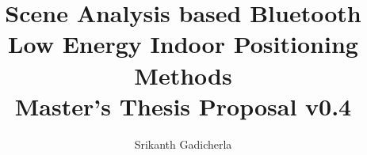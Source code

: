 \documentclass[a4paper,draft]{article}
\title{Scene Analysis based Bluetooth Low Energy Indoor Positioning Methods\\ \textnormal{Master's Thesis Proposal} \textnormal{v0.4}}
\author{Srikanth Gadicherla}
\begin{document}
\maketitle
\renewcommand{\arraystretch}{1.5}
\thiswillnotshow{  }


























\end{document}
